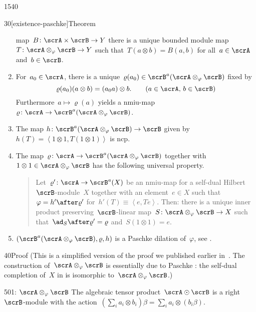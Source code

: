 \begin{parsec}{1540}
\begin{point}{30}[existence-paschke]{Theorem}
\begin{enumerate}
    map~$B \colon \scrA \times \scrB \to Y$
    there is a unique bounded
    module map~$T\colon \scrA \otimes_\varphi \scrB \to Y$
    such that~$T(a \otimes b) = B(a,b)$ for all~$a \in \scrA$ and~$b \in \scrB$.
\item
    For~$a_0 \in \scrA$,
    there is a unique~$\varrho(a_0) \in \scrB^a(\scrA \otimes_\varphi \scrB)$
            fixed by
            \begin{equation*}
                \varrho(a_0)(a\otimes b) = (a_0 a)\otimes b.
                    \text{\qquad ($a\in \scrA$, $b \in \scrB$)}
            \end{equation*}
    Furthermore~$a \mapsto \varrho(a)$
        yields a
        nmiu-map~$\varrho\colon \scrA \to \scrB^a(\scrA\otimes_\varphi \scrB)$.
\item
    The map
    $h\colon \scrB^a(\scrA\otimes_\varphi\scrB) \to \scrB$
    given by~$h(T) =\left<1 \otimes 1, T(1 \otimes 1)\right>$
    is ncp.
\item
The map~$\varrho \colon \scrA \to \scrB^a(\scrA \otimes_\varphi \scrB)$
    together with~$1\otimes 1 \in \scrA \otimes_\varphi \scrB$
    has the following universal property.
\begin{quote}
Let~$\varrho'\colon \scrA \to \scrB^a(X)$
    be an nmiu-map
    for a self-dual Hilbert~$\scrB$-module~$X$
    together with an element~$e \in X$
    such that~$\varphi  = h' \after \varrho'$
        for~$h'(T) \equiv \left<e,T e\right>$.
Then: there is a unique
        inner product preserving~$\scrB$-linear
        map~$S \colon \scrA\otimes_\varphi\scrB \to X$
        such that~$\ad_S \after \varrho' = \varrho$
        and~$S( 1\otimes 1) = e$.
\end{quote}
\item
$(\scrB^a(\scrA \otimes_\varphi \scrB), \varrho, h)$
        is a Paschke dilation of~$\varphi$, see .
\end{enumerate}
\spacingfix{}
\begin{point}{40}{Proof}%
(This is a simplified version of the proof
    we published earlier in~\cite{wwpaschke}.
The construction of~$\scrA \otimes_\varphi \scrB$
    is essentially due to Paschke \cite[thm.~5.2]{paschke}:
    the self-dual completion of~$X$ in \cite[thm.~5.2]{paschke}
    is isomorphic to~$\scrA \otimes_\varphi \scrB$.)
\begin{point}{50}{1: $\scrA \otimes_\varphi \scrB$}%
The algebraic tensor product~$\scrA \odot \scrB$
    is a right $\scrB$-module
with the action~$(\sum_i a_i \otimes b_i)\beta = \sum_i a_i \otimes(b_i\beta)$.

\end{point}
\end{point}
\end{point}
\end{parsec}
